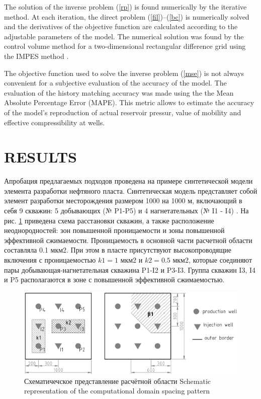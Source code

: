 \documentclass{article}
\begin{document}
The solution of the inverse problem (\ref{rp}) is found  numerically
by the iterative method. At each iteration, the direct problem
(\ref{fil})--(\ref{bc}) is numerically solved and the derivatives of
the objective function are calculated according to the adjustable
parameters of the \cite{opt} model. The numerical solution was found
by the control volume method for a two-dimensional rectangular
difference grid using the IMPES method \cite{azi}.

The objective function used to solve the inverse problem
({\ref{mse}}) is not always convenient for a subjective evaluation
of the accuracy of the model. 
The evaluation of the history matching accuracy was made using the the Mean Absolute Percentage Error (MAPE). This metric allows to estimate the accuracy of the model's reproduction of actual reservoir pressur, value of mobility and effective compressibility at wells.


\section{RESULTS}

Апробация предлагаемых подходов проведена на примере синтетической модели элемента разработки нефтяного пласта. Синтетическая модель представляет собой элемент разработки месторождения размером 1000 на 1000 м, включающий в себя 9 скважин: 5 добывающих (№ P1-P5) и 4 нагнетательных (№ I1 - I4) . На рис. \ref{fig:schime} приведена схема расстановки скважин, а также расположение неоднородностей: зон повышенной проницаемости и зоны повышенной эффективной сжимаемости. Проницаемость в основной части расчетной области составляла 0.1 мкм2. При этом в пласте присутствуют высокопроводящие включения с проницаемостью $k1 = 1$ мкм2 и $k2 = 0.5$ мкм2, которые соединяют пары добывающая-нагнетательная скважина P1-I2 и P3-I3. Группа скважин I3, I4 и P5 располагаются в зоне с повышенной эффективной сжимаемостью. 

\begin{figure}
	\centering
	\includegraphics[width=0.7\linewidth]{fig1}
	\caption{Схематичечское представление расчётной области Schematic representation of the computational domain spacing pattern}
	\label{fig:schime}
\end{figure}
\end{document}
